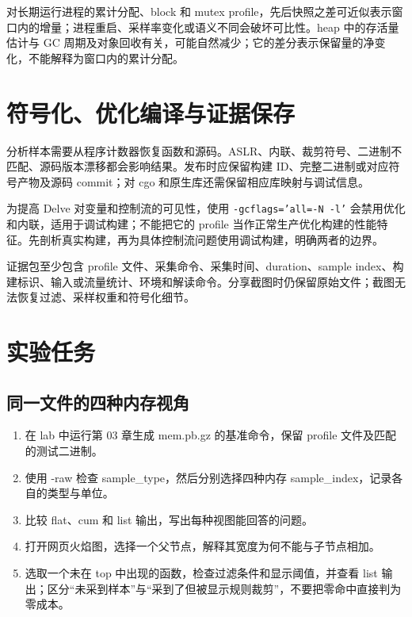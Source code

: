 \documentclass[UTF8,fontset=fandol,openany,11pt]{ctexbook}
\begin{document}
对长期运行进程的累计分配、block 和 mutex profile，先后快照之差可近似表示窗口内的增量；进程重启、采样率变化或语义不同会破坏可比性。heap 中的存活量估计与 GC 周期及对象回收有关，可能自然减少；它的差分表示保留量的净变化，不能解释为窗口内的累计分配。

\section{符号化、优化编译与证据保存}
分析样本需要从程序计数器恢复函数和源码。ASLR、内联、裁剪符号、二进制不匹配、源码版本漂移都会影响结果。发布时应保留构建 ID、完整二进制或对应符号产物及源码 commit；对 cgo 和原生库还需保留相应库映射与调试信息。

为提高 Delve 对变量和控制流的可见性，使用 \texttt{-\allowbreak{}gcflags='all=-\allowbreak{}N -\allowbreak{}l'} 会禁用优化和内联，适用于调试构建；不能把它的 profile 当作正常生产优化构建的性能特征。先剖析真实构建，再为具体控制流问题使用调试构建，明确两者的边界。

证据包至少包含 profile 文件、采集命令、采集时间、duration、sample index、构建标识、输入或流量统计、环境和解读命令。分享截图时仍保留原始文件；截图无法恢复过滤、采样权重和符号化细节。

\section{实验任务}
\subsection*{同一文件的四种内存视角}
\begin{enumerate}
\item 在 lab 中运行第 03 章生成 mem.pb.gz 的基准命令，保留 profile 文件及匹配的测试二进制。

\item 使用 -raw 检查 sample\_type，然后分别选择四种内存 sample\_index，记录各自的类型与单位。

\item 比较 flat、cum 和 list 输出，写出每种视图能回答的问题。

\item 打开网页火焰图，选择一个父节点，解释其宽度为何不能与子节点相加。

\item 选取一个未在 top 中出现的函数，检查过滤条件和显示阈值，并查看 list 输出；区分“未采到样本”与“采到了但被显示规则裁剪”，不要把零命中直接判为零成本。

\end{enumerate}
\end{document}

